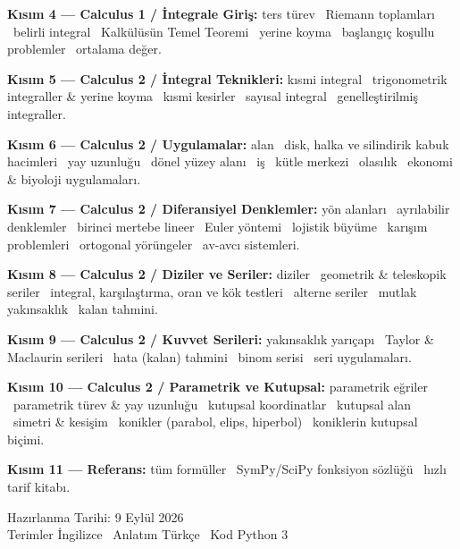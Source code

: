 \documentclass[11pt,a4paper]{article}
\begin{document}
\begin{titlepage}
\begin{center}
{{\textbf{Kısım 4 --- Calculus 1 / İntegrale Giriş:} ters türev \textbullet\
Riemann toplamları \textbullet\ belirli integral \textbullet\ Kalkülüsün Temel
Teoremi \textbullet\ yerine koyma \textbullet\ başlangıç koşullu problemler
\textbullet\ ortalama değer.\vspace{4pt}

\textbf{Kısım 5 --- Calculus 2 / İntegral Teknikleri:} kısmi integral
\textbullet\ trigonometrik integraller \& yerine koyma \textbullet\ kısmi
kesirler \textbullet\ sayısal integral \textbullet\ genelleştirilmiş
integraller.\vspace{4pt}

\textbf{Kısım 6 --- Calculus 2 / Uygulamalar:} alan \textbullet\ disk, halka ve
silindirik kabuk hacimleri \textbullet\ yay uzunluğu \textbullet\ dönel yüzey
alanı \textbullet\ iş \textbullet\ kütle merkezi \textbullet\ olasılık
\textbullet\ ekonomi \& biyoloji uygulamaları.\vspace{4pt}

\textbf{Kısım 7 --- Calculus 2 / Diferansiyel Denklemler:} yön alanları
\textbullet\ ayrılabilir denklemler \textbullet\ birinci mertebe lineer
\textbullet\ Euler yöntemi \textbullet\ lojistik büyüme \textbullet\ karışım
problemleri \textbullet\ ortogonal yörüngeler \textbullet\ av-avcı
sistemleri.\vspace{4pt}

\textbf{Kısım 8 --- Calculus 2 / Diziler ve Seriler:} diziler \textbullet\
geometrik \& teleskopik seriler \textbullet\ integral, karşılaştırma, oran ve
kök testleri \textbullet\ alterne seriler \textbullet\ mutlak yakınsaklık
\textbullet\ kalan tahmini.\vspace{4pt}

\textbf{Kısım 9 --- Calculus 2 / Kuvvet Serileri:} yakınsaklık yarıçapı
\textbullet\ Taylor \& Maclaurin serileri \textbullet\ hata (kalan) tahmini
\textbullet\ binom serisi \textbullet\ seri uygulamaları.\vspace{4pt}

\textbf{Kısım 10 --- Calculus 2 / Parametrik ve Kutupsal:} parametrik eğriler
\textbullet\ parametrik türev \& yay uzunluğu \textbullet\ kutupsal koordinatlar
\textbullet\ kutupsal alan \textbullet\ simetri \& kesişim \textbullet\
konikler (parabol, elips, hiperbol) \textbullet\ koniklerin kutupsal
biçimi.\vspace{4pt}

\textbf{Kısım 11 --- Referans:} tüm formüller \textbullet\ SymPy/SciPy
fonksiyon sözlüğü \textbullet\ hızlı tarif kitabı.\vspace{4pt}}}
\end{center}

\vfill
{\color{ortaGri}\large Hazırlanma Tarihi: 9 Eylül 2026}\\[4pt]
{\color{ortaGri} Terimler İngilizce \textbullet\ Anlatım Türkçe \textbullet\ Kod Python 3}
\vspace*{0.4cm}
\end{titlepage}
\end{document}
